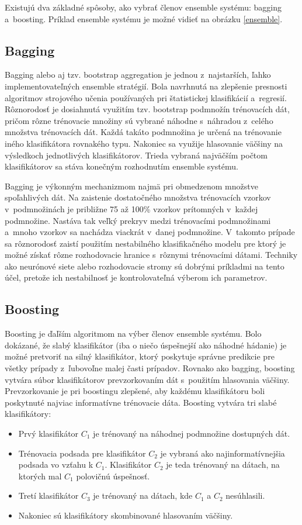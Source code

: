 Existujú dva základné spôsoby, ako vybrať členov ensemble systému: bagging a~boosting. Príklad ensemble systému je možné vidieť na obrázku \ref{ensemble}.

\subsection{Bagging}

Bagging \cite{breiman2} alebo aj tzv. bootstrap aggregation je jednou z~najstarších, ľahko implementovateľných ensemble stratégií. Bola navrhnutá na zlepšenie presnosti algoritmov strojového učenia používaných pri štatistickej klasifikácií a~regresií. Rôznorodosť je dosiahnutá využitím tzv. bootstrap podmnožín trénovacích dát, pričom rôzne trénovacie množiny sú vybrané náhodne s~náhradou z~celého množstva trénovacích dát. Každá takáto podmnožina je určená na trénovanie iného klasifikátora rovnakého typu. Nakoniec sa využije hlasovanie väčšiny na výsledkoch jednotlivých klasifikátorov. Trieda vybraná najväčším počtom klasifikátorov sa stáva konečným rozhodnutím ensemble systému.

Bagging je výkonným mechanizmom najmä pri obmedzenom množstve spoľahlivých dát. Na zaistenie dostatočného množstva trénovacích vzorkov v~podmnožinách je približne 75 až 100\% vzorkov prítomných v~každej podmnožine. Nastáva tak veľký prekryv medzi trénovacími podmnožinami a~mnoho vzorkov sa nachádza viackrát v~danej podmnožine. V~takomto prípade sa rôznorodosť zaistí použitím nestabilného klasifikačného modelu pre ktorý je možné získať rôzne rozhodovacie hranice s~rôznymi trénovacími dátami. Techniky ako neurónové siete alebo rozhodovacie stromy sú dobrými príkladmi na tento účel, pretože ich nestabilnosť je kontrolovateľná výberom ich parametrov.

\subsection{Boosting}

Boosting \cite{boosting} je ďaľším algoritmom na výber členov ensemble systému. Bolo dokázané, že slabý klasifikátor (iba o niečo úspešnejší ako náhodné hádanie) je možné pretvoriť na silný klasifikátor, ktorý poskytuje správne predikcie pre všetky prípady z~ľubovoľne malej časti prípadov. Rovnako ako bagging, boosting vytvára súbor klasifikátorov prevzorkovaním dát s~použitím hlasovania väčšiny. Prevzorkovanie je pri boostingu zlepšené, aby každému klasifikátoru boli poskytnuté najviac informatívne trénovacie dáta. Boosting vytvára tri slabé klasifikátory:
\begin{itemize}
	\item Prvý klasifikátor $C_{1}$ je trénovaný na náhodnej podmnožine dostupných dát.
	\item Trénovacia podsada pre klasifikátor $C_{2}$ je vybraná ako najinformatívnejšia podsada vo vzťahu k $C_{1}$. Klasifikátor $C_{2}$ je teda trénovaný na dátach, na ktorých mal $C_{1}$ polovičnú úspešnosť. 
	\item Tretí klasifikátor $C_{3}$ je trénovaný na dátach, kde $C_{1}$ a $C_{2}$ nesúhlasili.
	\item Nakoniec sú klasifikátory skombinované hlasovaním väčšiny.
\end{itemize}

